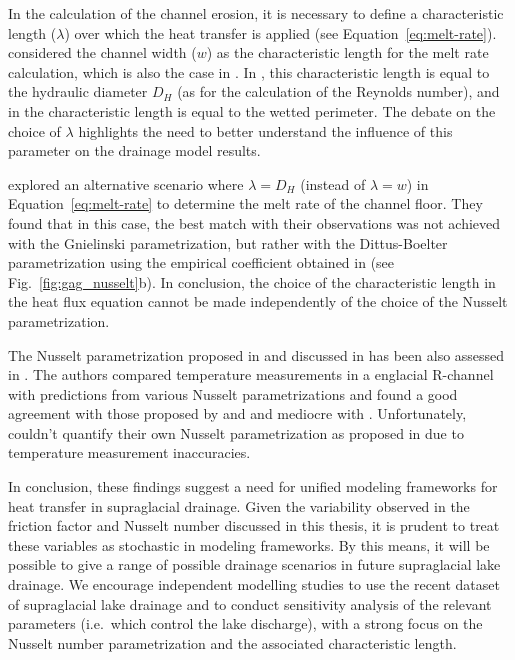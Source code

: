 In the calculation of the channel erosion, it is necessary to define a characteristic length ($\lambda$) over which the heat transfer is applied (see Equation~\ref{eq:melt-rate}). \cite{Gagliardini&al2024} considered the channel width ($w$) as the characteristic length for the melt rate calculation, which is also the case in \cite{Vincent&al2010}. In \cite{Clarke2003,Ogier&al2021,Sommers&Rajaram2020}, this characteristic length is equal to the hydraulic diameter $D_H$ (as for the calculation of the Reynolds number), and in \cite{Walder&Costa1996} the characteristic length is equal to the wetted perimeter. The debate on the choice of $\lambda$ highlights the need to better understand the influence of this parameter on the drainage model results.

\cite{Gagliardini&al2024} explored an alternative scenario where $\lambda = D_H$ (instead of $\lambda = w$) in Equation~\ref{eq:melt-rate} to determine the melt rate of the channel floor. They found that in this case, the best match with their observations was not achieved with the Gnielinski parametrization, but rather with the Dittus-Boelter parametrization using the empirical coefficient obtained in \cite{Ogier&al2021} (see Fig.~\ref{fig:gag_nusselt}b). In conclusion, the choice of the characteristic length in the heat flux equation cannot be made independently of the choice of the Nusselt parametrization. 

The Nusselt parametrization proposed in \cite{Ogier&al2021} and discussed in \cite{Gagliardini&al2024} has been also assessed in \cite{pohle&&2022}. The authors compared temperature measurements in a englacial R-channel with predictions from various Nusselt parametrizations \citep{Lunardini&al1986, Clarke2003, Vincent&al2010, Sommers&Rajaram2020, Ogier&al2021} and found a good agreement with those proposed by \cite{Ogier&al2021} and \cite{Vincent&al2010} and mediocre with \cite{Lunardini&al1986,Clarke2003,Sommers&Rajaram2020}. Unfortunately, \cite{pohle&&2022} couldn't quantify their own Nusselt parametrization as proposed in \cite{Ogier&al2021} due to temperature measurement inaccuracies. 

In conclusion, these findings suggest a need for unified modeling frameworks for heat transfer in supraglacial drainage. Given the variability observed in the friction factor and Nusselt number discussed in this thesis, it is prudent to treat these variables as stochastic in modeling frameworks. By this means, it will be possible to give a range of possible drainage scenarios in future supraglacial lake drainage. We encourage independent modelling studies \citep[e.g.][]{Jarosch&Gudmundsson2012,Kingslake&al2015} to use the recent dataset of supraglacial lake drainage \citep[e.g.][]{Vincent&al2010,Ogier&al2021,Gagliardini&al2024} and to conduct sensitivity analysis of the relevant parameters (i.e.\ which control the lake discharge), with a strong focus on the Nusselt number parametrization and the associated characteristic length. 


